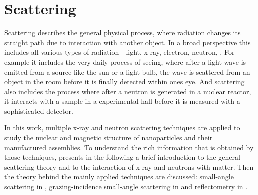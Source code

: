 \documentclass[\main/dresen_thesis.tex]{subfiles}
\renewcommand{\thisPath}{\main/chapters/theoreticalBackground/scattering}
\begin{document}
  \section{Scattering}\label{sec:theoreticalBackground:scattering}
    Scattering describes the general physical process, where radiation changes its straight path due to interaction with another object.
    In a broad perspective this includes all various types of radiation - light, x-ray, electron, neutron, \etc .
    For example it includes the very daily process of seeing, where after a light wave is emitted from a source like the sun or a light bulb, the wave is scattered from an object in the room before it is finally detected within ones eye.
    And scattering also includes the process where after a neutron is generated in a nuclear reactor, it interacts with a sample in a experimental hall before it is measured with a sophisticated detector.

    In this work, multiple x-ray and neutron scattering techniques are applied to study the nuclear and magnetic structure of nanoparticles and their manufactured assemblies.
    To understand the rich information that is obtained by those techniques,  presents in the following a brief introduction to the general scattering theory and  to the interaction of x-ray and neutrons with matter.
    Then the theory behind the mainly applied techniques are discussed: small-angle scattering in , grazing-incidence small-angle scattering in  and reflectometry in .

    
    
    
    
    
    
\end{document}
